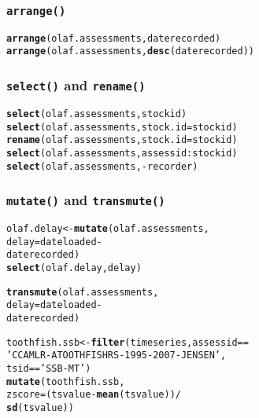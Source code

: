 \documentclass{beamer}\usepackage[]{graphicx}\usepackage[]{color}
\makeatletter
\newcommand{\hlstr}[1]{\textcolor[rgb]{0.192,0.494,0.8}{#1}}%
\newcommand{\hlopt}[1]{\textcolor[rgb]{0,0,0}{#1}}%
\newcommand{\hlstd}[1]{\textcolor[rgb]{0.345,0.345,0.345}{#1}}%
\newcommand{\hlkwb}[1]{\textcolor[rgb]{0.69,0.353,0.396}{#1}}%
\newcommand{\hlkwc}[1]{\textcolor[rgb]{0.333,0.667,0.333}{#1}}%
\newcommand{\hlkwd}[1]{\textcolor[rgb]{0.737,0.353,0.396}{\textbf{#1}}}%
\newenvironment{kframe}{%
 \def\at@end@of@kframe{}%
 \ifinner\ifhmode%
  \def\at@end@of@kframe{\end{minipage}}%
  \begin{minipage}{\columnwidth}%
 \fi\fi%
 \def\FrameCommand##1{\hskip\@totalleftmargin \hskip-\fboxsep
 \colorbox{shadecolor}{##1}\hskip-\fboxsep
     \hskip-\linewidth \hskip-\@totalleftmargin \hskip\columnwidth}%
 \MakeFramed {\advance\hsize-\width
   \@totalleftmargin\z@ \linewidth\hsize
   \@setminipage}}%
 {\par\unskip\endMakeFramed%
 \at@end@of@kframe}
\newenvironment{knitrout}{}{} %
\makeatother
\begin{document}

\begin{frame}[fragile]
  \frametitle{\texttt{arrange()}}
\begin{knitrout}
\color{fgcolor}\begin{kframe}
\begin{alltt}
\hlkwd{arrange}\hlstd{(olaf.assessments, daterecorded)}
\hlkwd{arrange}\hlstd{(olaf.assessments,} \hlkwd{desc}\hlstd{(daterecorded))}
\end{alltt}
\end{kframe}
\end{knitrout}
\end{frame}


\begin{frame}[fragile]
  \frametitle{\texttt{select()} and \texttt{rename()}}
\begin{knitrout}
\color{fgcolor}\begin{kframe}
\begin{alltt}
\hlkwd{select}\hlstd{(olaf.assessments, stockid)}
\hlkwd{select}\hlstd{(olaf.assessments,} \hlkwc{stock.id} \hlstd{= stockid)}
\hlkwd{rename}\hlstd{(olaf.assessments,} \hlkwc{stock.id} \hlstd{= stockid)}
\hlkwd{select}\hlstd{(olaf.assessments, assessid}\hlopt{:}\hlstd{stockid)}
\hlkwd{select}\hlstd{(olaf.assessments,} \hlopt{-}\hlstd{recorder)}
\end{alltt}
\end{kframe}
\end{knitrout}
\end{frame}


\begin{frame}[fragile]
  \frametitle{\texttt{mutate()} and \texttt{transmute()}}
\begin{knitrout}
\color{fgcolor}\begin{kframe}
\begin{alltt}
\hlstd{olaf.delay} \hlkwb{<-} \hlkwd{mutate}\hlstd{(olaf.assessments,}
                     \hlkwc{delay} \hlstd{= dateloaded} \hlopt{-}
                       \hlstd{daterecorded)}
\hlkwd{select}\hlstd{(olaf.delay, delay)}

\hlkwd{transmute}\hlstd{(olaf.assessments,}
                     \hlkwc{delay} \hlstd{= dateloaded} \hlopt{-}
                       \hlstd{daterecorded)}

\hlstd{toothfish.ssb} \hlkwb{<-} \hlkwd{filter}\hlstd{(timeseries, assessid} \hlopt{==}
                          \hlstr{'CCAMLR-ATOOTHFISHRS-1995-2007-JENSEN'}\hlstd{,}
                        \hlstd{tsid} \hlopt{==} \hlstr{'SSB-MT'}\hlstd{)}
\hlkwd{mutate}\hlstd{(toothfish.ssb,}
       \hlkwc{zscore} \hlstd{= (tsvalue} \hlopt{-} \hlkwd{mean}\hlstd{(tsvalue))} \hlopt{/}
         \hlkwd{sd}\hlstd{(tsvalue))}
\end{alltt}
\end{kframe}
\end{knitrout}
\end{frame}
\end{document}
